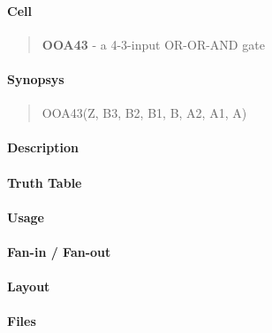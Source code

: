 \label{OOA43}
\paragraph{Cell}
\begin{quote}
    \textbf{OOA43} - a 4-3-input OR-OR-AND gate
\end{quote}

\paragraph{Synopsys}
\begin{quote}
    OOA43(Z, B3, B2, B1, B, A2, A1, A)
\end{quote}

\paragraph{Description}

%

\paragraph{Truth Table}
%

\paragraph{Usage}

\paragraph{Fan-in / Fan-out}

\paragraph{Layout}

\paragraph{Files}

